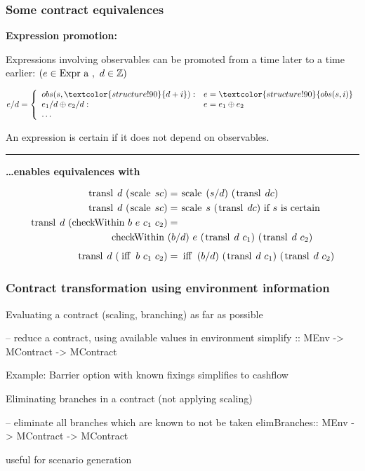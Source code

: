 \documentclass[xcolor=dvipsnames,11pt]{beamer}
\renewcommand{\emph}[1]{\textcolor{structure!90}{#1}}
\newcommand{\ttt}[1]{\mbox{\cd{#1}~}}
\newcommand{\scale}{\ttt{scale}}
\newcommand{\transl}{\ttt{transl}}
\newcommand{\ifff}{\ttt{iff}}
\newcommand{\checkWithin}{\ttt{checkWithin}}
\begin{document}
\begin{frame}[t] \frametitle{Some contract equivalences}

\emph{\textbf{Expression promotion:}}

Expressions involving observables can be \emph{promoted} from a time later to a time earlier:
%
\hfill {\footnotesize $(e \in \ttt{Expr a},\ d \in \mathbb{Z})$}

{\footnotesize 
$$ e / d = \left \{
\begin{array}{ll}
obs(s,\emph{d+i}) :& e = \emph{obs(s,i)}\\
e_1/d \oplus e_2/d :& e = e_1 \oplus e_2\\
\ldots
\end{array}
\right .$$
}

An expression is \emph{certain} if it does not depend on observables.
\medskip

\hrule
\medskip

\emph{\textbf{\ldots enables equivalences with }}

{\footnotesize
\begin{align*}
    \transl d~ (\scale s c)       &=  \scale (s/d) ~(\transl d c)\\
    \transl d~ (\scale s c)       &=  \scale s~ (\transl d c)\  \mbox{if } s \mbox{ is certain}\\
%
  \transl d~ (\checkWithin b ~ e  ~c_1 ~c_2)  &=  \\
                             \checkWithin &(b/d)~ e~ (\transl d ~c_1) ~(\transl d ~c_2)\\[1ex]
  \transl d~ (\ifff b~ c_1 ~c_2)  &= \ifff (b/d)~ (\transl d ~c_1)~ (\transl d ~c_2)\\
\end{align*}
}

\end{frame}


\begin{frame}[fragile,t]
    \frametitle{Contract transformation using environment information}

\emph{Evaluating a contract (scaling, branching) as far as possible}
\begin{hscode}
-- reduce a contract, using available values in environment
simplify :: MEnv -> MContract -> MContract
\end{hscode}

\emph{Example:} Barrier option with known fixings simplifies to cashflow

\hrulefill

\emph{Eliminating branches in a contract (not applying scaling)}
\begin{hscode}
-- eliminate all branches which are known to not be taken
elimBranches:: MEnv -> MContract -> MContract
\end{hscode}

useful for scenario generation
\end{frame}
\end{document}

